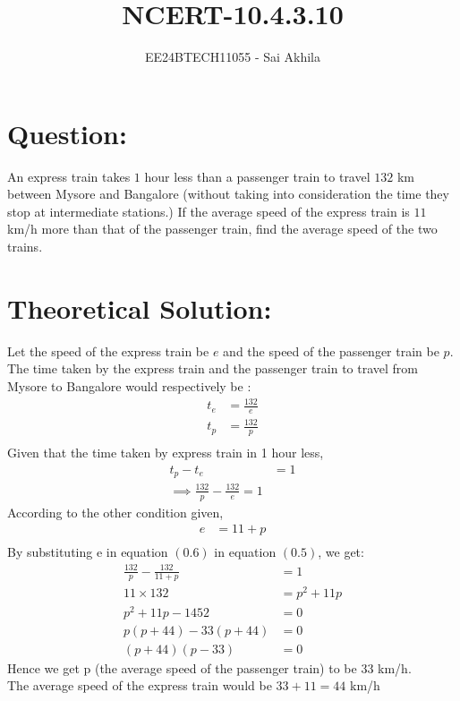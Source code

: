 \documentclass[journal]{IEEEtran}
\begin{document}

\vspace{3cm}

\title{NCERT-10.4.3.10}
\author{EE24BTECH11055 - Sai Akhila}
{\let\newpage\relax\maketitle}

\renewcommand{\thefigure}{\theenumi}
\renewcommand{\thetable}{\theenumi}
\setlength{\intextsep}{10pt} %


\renewcommand{\thetable}{\theenumi}

\section*{Question:}
An express train takes $1$ hour less than a passenger train to travel $132$ km between Mysore and Bangalore (without taking into consideration the time they stop at intermediate stations.) If the average speed of the express train is $11$ km/h more than that of the passenger train, find the average speed of the two trains.
\section*{Theoretical Solution:}
Let the speed of the express train be $e$ and the speed of the passenger train be $p$. The time taken by the express train and the passenger train to travel from Mysore to Bangalore would respectively be :\\
\begin{align}
    t_e&=\frac{132}{e}\\
    t_p&=\frac{132}{p}\\
\end{align}
Given that the time taken by express train in 1 hour less,
\begin{align}
    t_p-t_e&=1\\
    \implies \frac{132}{p}-\frac{132}{e}=1
\end{align}
According to the other condition given, 
\begin{align}
    e&=11+p\\
\end{align}
By substituting e in equation $(0.6)$ in equation $(0.5)$, we get:
\begin{align}
    \frac{132}{p}-\frac{132}{11+p}&=1\\
    11\times132&=p^2+11p\\
    p^2+11p-1452&=0\\
    p(p+44)-33(p+44)&=0\\
    (p+44)(p-33)&=0
\end{align}
Hence we get p (the average speed of the passenger train) to be $33$ km/h.\\
The average speed of the express train would be $33+11=44$ km/h
\end{document}
